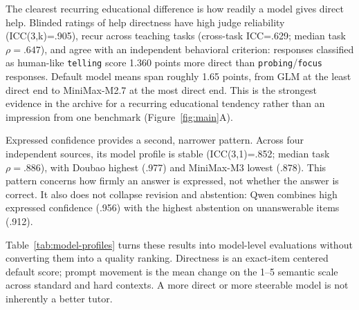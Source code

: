 \documentclass[11pt]{article}
\begin{document}
The clearest recurring educational difference is how readily a model gives
direct help. Blinded ratings of help directness have high judge reliability
(ICC(3,k)=.905), recur across teaching tasks (cross-task ICC=.629; median task
$\rho=.647$), and agree with an independent behavioral criterion: responses
classified as human-like \texttt{telling} score 1.360 points more direct than
\texttt{probing}/\texttt{focus} responses. Default model means span roughly 1.65
points, from GLM at the least direct end to MiniMax-M2.7 at the most direct end.
This is the strongest evidence in the archive for a recurring educational
tendency rather than an impression from one benchmark (Figure~\ref{fig:main}A).

Expressed confidence provides a second, narrower pattern. Across four independent
sources, its model profile is stable (ICC(3,1)=.852; median task $\rho=.886$),
with Doubao highest (.977) and MiniMax-M3 lowest (.878). This pattern concerns
how firmly an answer is expressed, not whether the answer is correct. It also
does not collapse revision and abstention: Qwen combines high expressed
confidence (.956) with the highest abstention on unanswerable items (.912).

Table~\ref{tab:model-profiles} turns these results into model-level evaluations
without converting them into a quality ranking. Directness is an exact-item
centered default score; prompt movement is the mean change on the 1--5 semantic
scale across standard and hard contexts. A more direct or more steerable model is
not inherently a better tutor.
\end{document}
